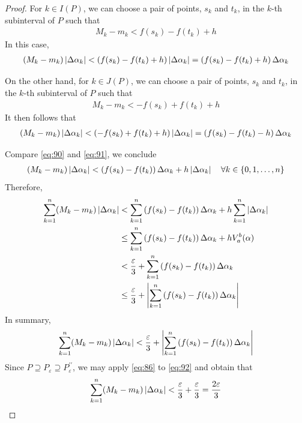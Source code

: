 \documentclass[thmcnt=section, 12pt]{my-elegantbook}
\begin{document}
\begin{proof}
    For $k \in I(P)$, we can choose a pair of points, $s_k$ and $t_k$, in the $k$-th subinterval of $P$ such that 
    \begin{align*}
        M_k - m_k < f(s_k) - f(t_k) + h
    \end{align*}
    In this case, 
    \begin{align}
        (M_k - m_k)\left\lvert \Delta\alpha_k \right\rvert
        < \left(f(s_k) - f(t_k) + h\right)\left\lvert \Delta\alpha_k \right\rvert
        =  \left(f(s_k) - f(t_k) + h\right) \Delta\alpha_k
        \label{eq:90}
    \end{align}

    On the other hand, for $k \in J(P)$, we can choose a pair of points, $s_k$ and $t_k$, in the $k$-th subinterval of $P$ such that 
    \begin{align*}
        M_k - m_k < -f(s_k) + f(t_k) + h
    \end{align*}
    It then follows that
    \begin{align}
        (M_k - m_k)\left\lvert \Delta\alpha_k \right\rvert
        < \left(-f(s_k) + f(t_k) + h\right)\left\lvert \Delta\alpha_k \right\rvert
        =  \left(f(s_k) - f(t_k) - h\right) \Delta\alpha_k
        \label{eq:91}
    \end{align}

    Compare \eqref{eq:90} and \eqref{eq:91}, we conclude
    \begin{align*}
        (M_k - m_k)\left\lvert \Delta\alpha_k \right\rvert
        < \left(f(s_k) - f(t_k)\right) \Delta\alpha_k
        + h \left\lvert \Delta\alpha_k \right\rvert
        \quad \forall k \in \left\{0, 1, \ldots, n\right\}
    \end{align*}
    Therefore, 
    \begin{align*}
        \sum_{k=1}^n (M_k - m_k) \left\lvert \Delta\alpha_k \right\rvert
        &< \sum_{k=1}^n \left(f(s_k) - f(t_k)\right) \Delta\alpha_k + h \sum_{k=1}^n \left\lvert \Delta\alpha_k \right\rvert \\ 
        &\leq \sum_{k=1}^n \left(f(s_k) - f(t_k)\right) \Delta\alpha_k + h V_a^b (\alpha) \\ 
        &< \frac{\varepsilon}{3} + \sum_{k=1}^n \left(f(s_k) - f(t_k)\right)\Delta\alpha_k \\ 
        &\leq \frac{\varepsilon}{3} + \left\lvert \sum_{k=1}^n \left(f(s_k) - f(t_k)\right)\Delta\alpha_k \right\rvert
    \end{align*}
    In summary,
    \begin{align}
        \sum_{k=1}^n (M_k - m_k) \left\lvert \Delta\alpha_k \right\rvert
        < \frac{\varepsilon}{3} + \left\lvert \sum_{k=1}^n \left(f(s_k) - f(t_k)\right)\Delta\alpha_k \right\rvert
        \label{eq:92}
    \end{align}
    Since $P \supseteq P_\varepsilon \supseteq P^{\prime\prime}_\varepsilon$, we may apply \eqref{eq:86} to \eqref{eq:92} and obtain that 
    \begin{align}
        \sum_{k=1}^n (M_k - m_k) \left\lvert \Delta\alpha_k \right\rvert
        < \frac{\varepsilon}{3} + \frac{\varepsilon}{3}
        = \frac{2\varepsilon}{3}
        \label{eq:93}
    \end{align}


\end{proof}
\end{document}
